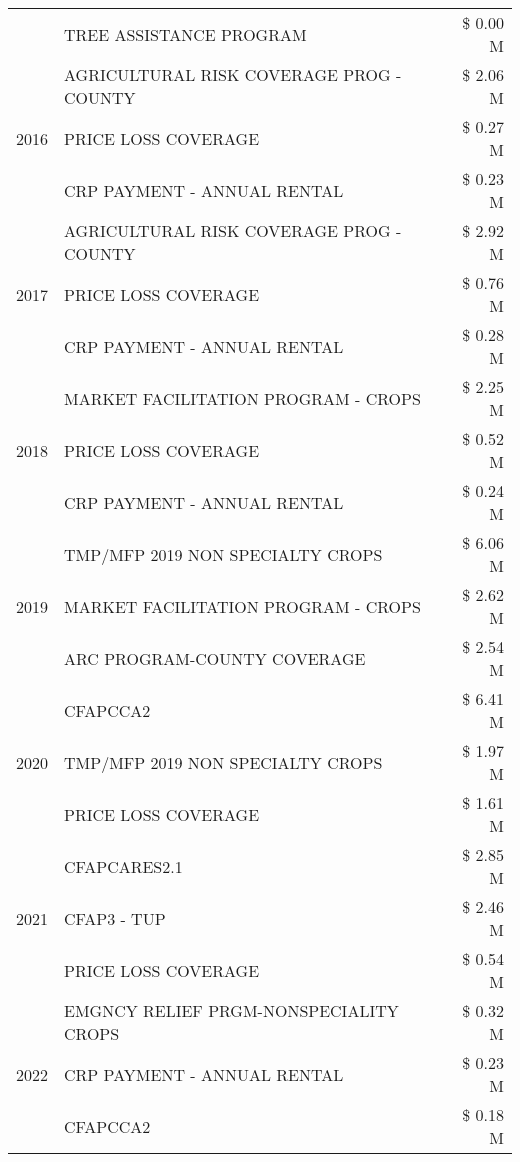 \begin{tabular}{llr}
 & TREE ASSISTANCE PROGRAM & \$ 0.00 M \\
\cline{1-3}
\multirow[t]{3}{*}{2016} & AGRICULTURAL RISK COVERAGE PROG - COUNTY & \$ 2.06 M \\
 & PRICE LOSS COVERAGE & \$ 0.27 M \\
 & CRP PAYMENT - ANNUAL RENTAL & \$ 0.23 M \\
\cline{1-3}
\multirow[t]{3}{*}{2017} & AGRICULTURAL RISK COVERAGE PROG - COUNTY & \$ 2.92 M \\
 & PRICE LOSS COVERAGE & \$ 0.76 M \\
 & CRP PAYMENT - ANNUAL RENTAL & \$ 0.28 M \\
\cline{1-3}
\multirow[t]{3}{*}{2018} & MARKET FACILITATION PROGRAM - CROPS & \$ 2.25 M \\
 & PRICE LOSS COVERAGE & \$ 0.52 M \\
 & CRP PAYMENT - ANNUAL RENTAL & \$ 0.24 M \\
\cline{1-3}
\multirow[t]{3}{*}{2019} & TMP/MFP 2019 NON SPECIALTY CROPS & \$ 6.06 M \\
 & MARKET FACILITATION PROGRAM - CROPS & \$ 2.62 M \\
 & ARC PROGRAM-COUNTY COVERAGE & \$ 2.54 M \\
\cline{1-3}
\multirow[t]{3}{*}{2020} & CFAPCCA2 & \$ 6.41 M \\
 & TMP/MFP 2019 NON SPECIALTY CROPS & \$ 1.97 M \\
 & PRICE LOSS COVERAGE & \$ 1.61 M \\
\cline{1-3}
\multirow[t]{3}{*}{2021} & CFAPCARES2.1 & \$ 2.85 M \\
 & CFAP3 - TUP & \$ 2.46 M \\
 & PRICE LOSS COVERAGE & \$ 0.54 M \\
\cline{1-3}
\multirow[t]{3}{*}{2022} & EMGNCY RELIEF PRGM-NONSPECIALITY CROPS & \$ 0.32 M \\
 & CRP PAYMENT - ANNUAL RENTAL & \$ 0.23 M \\
 & CFAPCCA2 & \$ 0.18 M \\
\cline{1-3}
\bottomrule
\end{tabular}
